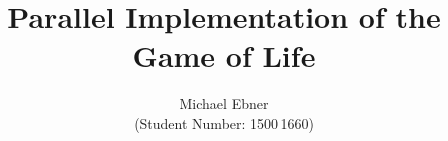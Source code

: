 \documentclass[%
	11pt,%
	a4paper,%
	]{scrreprt}
\renewcommand{\sectionmark}[1]{\markboth{\thesection.\ #1}{}}
\renewcommand{\subsectionmark}[1]{\markright{\thesubsection.\ #1}{}}
\begin{document}
\pagestyle{fancy}
\lhead{\leftmark}
\chead{}
\rhead{\rightmark}
\lfoot{}
\cfoot{\thepage}
\rfoot{}

\title{Parallel Implementation of the Game of Life}
\subject{MPHYG002: Research Computing with C++}
\author{Michael Ebner\\(Student Number: 1500\,1660)}



\maketitle           
\thispagestyle{empty} 
\cleardoublepage

\pagestyle{plain}     %
\tableofcontents      
\cleardoublepage

\pagestyle{fancy}
\setcounter{page}{1}




%


%
\end{document}
